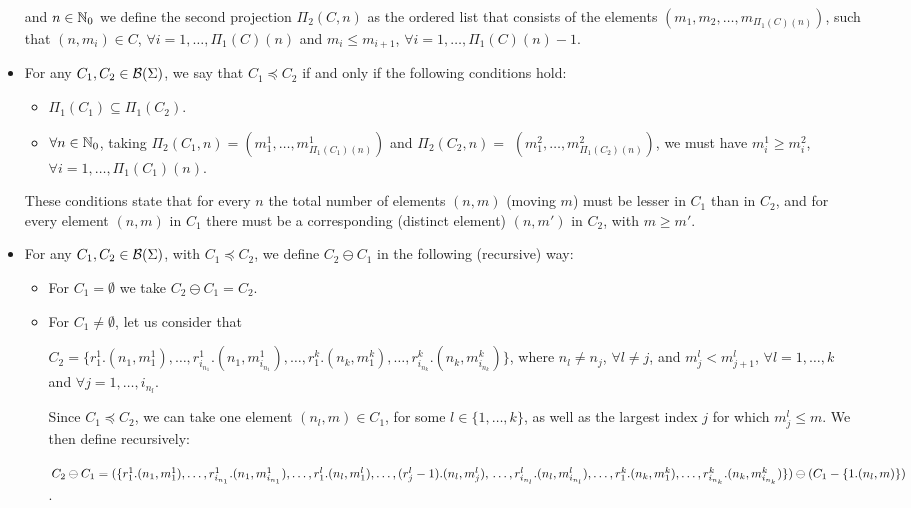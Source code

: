 \begin{definition}
\begin{itemize}
and $n\in \mathbb{N}_{0}$ we define the second projection 
$\Pi_2(C,n)$ as the ordered list that consists of the
elements $(m_1,m_2,\ldots,m_{\Pi_1(C)(n)})$,
such that $(n,m_i) \in C$, $\forall i=1,\ldots, \Pi_1(C)(n)$
and $m_i \leq m_{i+1}$,
$\forall i=1,\ldots, \Pi_1(C)(n)-1$.
%
\item For any $C_1,C_2 \in {\cal B}(\Sigma)$, we say that
$C_1 \preceq C_2$ if and only if the following conditions hold:
  \begin{itemize}
  \item $\Pi_1(C_1) \subseteq \Pi_1(C_2)$.
  \item \mbox{$\forall n \in \mathbb{N}_{0}$}, taking \mbox{$\Pi_2(C_1,n) = (m^1_1,\ldots,
        m^1_{\Pi_1(C_1)(n)})$} and
        \mbox{$\Pi_2(C_2,n) = $} \linebreak
        $(m^2_1,\ldots,m^2_{\Pi_1(C_2)(n)})$,
        we must have  $m^1_i \geq m^2_i$, $\forall i=1,\ldots,
        \Pi_1(C_1)(n)$.
  \end{itemize}
%
%  
These conditions state that for every $n$ the total number of
elements $(n,m)$ (moving $m$) must be lesser in $C_1$ than in $C_2$, and 
for every element $(n,m)$ in $C_1$ there must be a 
corresponding (distinct element) $(n,m')$ in $C_2$, with $m\geq m'$.
%
\item For any $C_1,C_2 \in {\cal B}(\Sigma)$, with $C_1 \preceq C_2$,
we define $C_2 \ominus C_1$ in the following (recursive) way: 
  \begin{itemize}
  \item For $C_1 = \emptyset$ we take $C_2 \ominus C_1 = C_2$.
  \item For $C_1 \neq \emptyset$, let us consider that 

        \noindent $C_2 = \{ r^1_1.(n_1,m^1_1), \ldots,
         r^1_{i_{n_{1}}}.(n_1,m^1_{i_{n_{1}}}),
        \ldots, r^k_1.(n_k,m^k_1),\ldots, r^k_{i_{n_{k}}}.(n_k,m^k_{i_{n_{k}}}) \}$,
        where $n_l \neq n_j$, $\forall l \neq j$, and
        $m^l_j < m^l_{j+1}$, $\forall l=1,\ldots,k$ and $\forall
        j=1,\ldots,i_{n_{l}}$.

        Since $C_1 \preceq C_2$, we can take one element $(n_l,m) \in C_1$, 
        for some $l\in \{1,\ldots,k\}$, as well as the largest index $j$
        for which $m^l_{j} \leq m$. We then define recursively:
       
        \noindent $C_2 \ominus C_1 = %
        (
        \{ r^1_1.(n_1,m^1_1), \ldots, r^1_{i_{n_{1}}}.(n_1,m^1_{i_{n_{1}}}),
        \ldots,
        r^l_1.(n_l,m^l_1), \ldots,(r^l_{j} - 1).(n_l,m^l_j),\\
        \ldots,
        r^l_{i_{n_{l}}}.(n_l,m^l_{i_{n_{l}}}), 
        \ldots, r^k_1.(n_k,m^k_1),\ldots, r^k_{i_{n_{k}}}.(n_k,m^k_{i_{n_{k}}}) \}
        ) 
        \ominus (C_1 - \{ 1.(n_l,m) \})
        $.


\end{itemize}
\end{itemize}
\end{definition}
